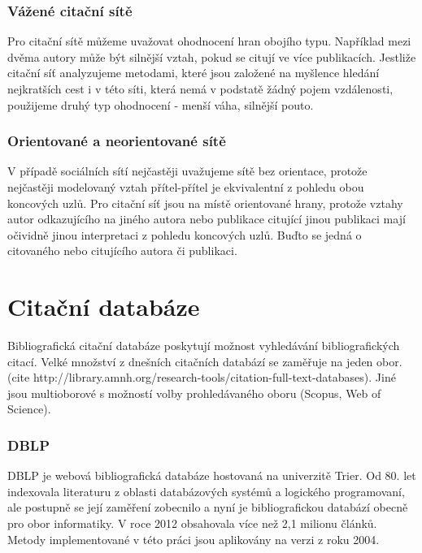 \documentclass{bakalarka}
\begin{document}
\subsection{Vážené citační sítě}
Pro citační sítě můžeme uvažovat ohodnocení hran obojího typu. Například mezi
dvěma autory může být silnější vztah, pokud se citují ve více publikacích.
Jestliže citační síť analyzujeme metodami, které jsou založené na myšlence
hledání nejkratších cest i v této síti, která nemá v podstatě žádný pojem
vzdálenosti, použijeme druhý typ ohodnocení - menší váha, silnější pouto.

\subsection{Orientované a neorientované sítě}
V případě sociálních sítí nejčastěji uvažujeme sítě bez orientace, protože
nejčastěji modelovaný vztah přítel-přítel je ekvivalentní z pohledu obou
koncových uzlů. Pro citační síť jsou na místě orientované hrany, protože vztahy
autor odkazujícího na jiného autora nebo publikace citující jinou publikaci
mají očividně jinou interpretaci z pohledu koncových uzlů. Buďto se jedná o
citovaného nebo citujícího autora či publikaci.


\chapter{Citační databáze}
Bibliografická citační databáze poskytují možnost vyhledávání bibliografických
citací. Velké množství z dnešních citačních databází se zaměřuje na jeden obor.
(cite http://library.amnh.org/research-tools/citation-full-text-databases).
Jiné jsou multioborové s možností volby prohledávaného oboru (Scopus, Web of
Science).

\subsection{DBLP}
DBLP \cite{DBLP} je webová bibliografická databáze hostovaná na univerzitě
Trier. Od 80.  let indexovala literaturu z oblasti databázových systémů a
logického programovaní, ale postupně se její zaměření zobecnilo a nyní je
bibliografickou databází obecně pro obor informatiky. 
V roce 2012 obsahovala více než 2,1 milionu článků. Metody implementované v
této práci jsou aplikovány na verzi z roku 2004. 
\end{document}
